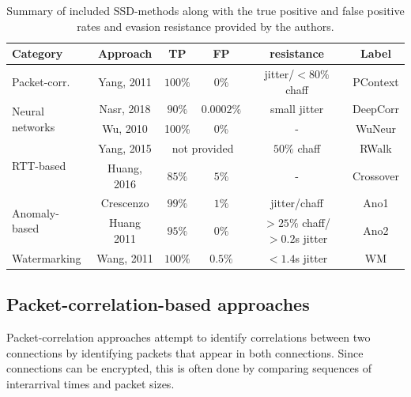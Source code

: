 \documentclass[runningheads]{llncs}\usepackage[]{graphicx}\usepackage[]{color}
\begin{document}
\begin{table}
\centering
\begin{tabular}{l|c|c|c|c|c}
Category & Approach & TP & FP & resistance & Label\\ \hline

Packet-corr. & Yang, 2011 \cite{yang2011correlating} & $100\%$ & $0\%$& jitter/$<80\%$ chaff & PContext\\ \hline

\multirow{2}{*}{Neural networks} & Nasr, 2018 \cite{nasr2018deepcorr} &$90\%$ & $0.0002\%$& small jitter & DeepCorr\\ \cline{2-6}
 
 & Wu, 2010 \cite{wu2010neural} & 100\% & 0\% & - & WuNeur\\ \hline
 
\multirow{2}{*}{RTT-based} & Yang, 2015 \cite{yang2015rtt}& \multicolumn{2}{c|}{not provided} & $50\%$ chaff &RWalk\\ \cline{2-6}

& Huang, 2016 \cite{huang2016detecting} & $85\%$ & $5\%$ & - & Crossover\\ \hline
 
\multirow{2}{*}{Anomaly-based} & Crescenzo \cite{di2011detecting} & $99\%$ & $1\%$ & jitter/chaff &Ano1\\ \cline{2-6}

& Huang 2011 \cite{huang2011detecting,ding2013detecting} & $95\%$ & $0\%$ & $>25\%$ chaff/ $>0.2$s jitter &Ano2\\ \hline

Watermarking & Wang, 2011 \cite{wang2010robust} & $100\%$ & $0.5\%$ &  $<1.4$s jitter & WM\\ \hline
\end{tabular}
\caption{Summary of included SSD-methods along with the true positive and false positive rates and evasion resistance provided by the authors. }\label{Tab:Summary}
\end{table}




\subsection{Packet-correlation-based approaches}

Packet-correlation approaches attempt to identify correlations between two connections by identifying packets that appear in both connections. Since connections can be encrypted, this is often done by comparing sequences of interarrival times and packet sizes.
\end{document}
